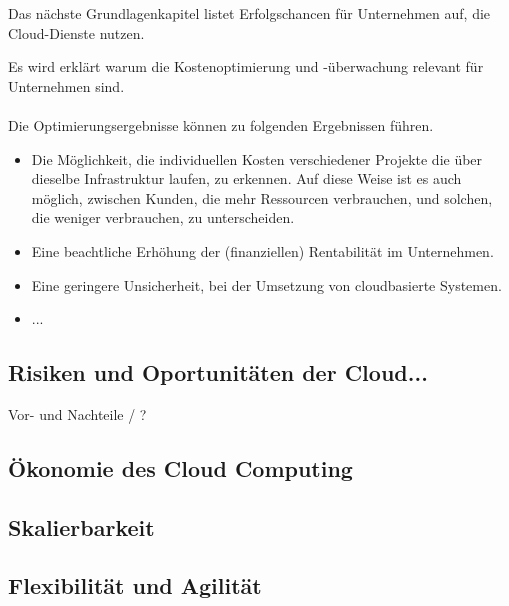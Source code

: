 Das nächste Grundlagenkapitel listet Erfolgschancen für Unternehmen auf, die Cloud-Dienste nutzen. 

Es wird erklärt warum die Kostenoptimierung und -überwachung relevant für Unternehmen sind.
\\\\
Die Optimierungsergebnisse können zu folgenden Ergebnissen führen.
\begin{itemize}
      \item
            Die Möglichkeit, die individuellen Kosten verschiedener Projekte die über dieselbe Infrastruktur laufen, zu erkennen. Auf diese Weise ist es auch möglich, zwischen Kunden, die mehr Ressourcen verbrauchen, und solchen, die weniger verbrauchen, zu unterscheiden.
      \item
            Eine beachtliche Erhöhung der (finanziellen) Rentabilität im Unternehmen.
      \item
            Eine geringere Unsicherheit, bei der Umsetzung von cloudbasierte Systemen.
      \item
            ...
\end{itemize}



\subsection{Risiken und Oportunitäten der Cloud...}\label{subsec_UabsGrund2}
Vor- und Nachteile / ?

\subsection{Ökonomie des Cloud Computing}\label{subsec_UabsGrund3}
\subsection{Skalierbarkeit}

\subsection{Flexibilität und Agilität}

